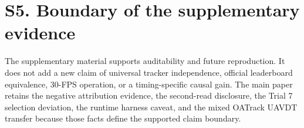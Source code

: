 \documentclass[11pt]{article}
\begin{document}
\section*{S5. Boundary of the supplementary evidence}

The supplementary material supports auditability and future reproduction. It
does not add a new claim of universal tracker independence, official leaderboard
equivalence, 30-FPS operation, or a timing-specific causal gain. The main paper
retains the negative attribution evidence, the second-read disclosure, the
Trial 7 selection deviation, the runtime harness caveat, and the mixed OATrack
UAVDT transfer because those facts define the supported claim boundary.
\end{document}
